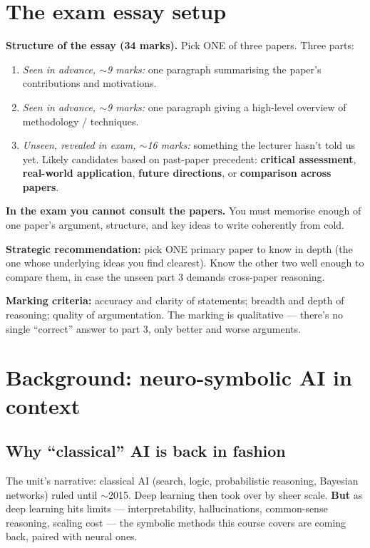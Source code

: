 \documentclass[11pt, a4paper]{article}
\begin{document}
\section{The exam essay setup}

\textbf{Structure of the essay (34 marks).} Pick ONE of three papers. Three parts:

\begin{enumerate}
  \item \emph{Seen in advance, $\sim$9 marks:} one paragraph summarising the paper's contributions and motivations.
  \item \emph{Seen in advance, $\sim$9 marks:} one paragraph giving a high-level overview of methodology / techniques.
  \item \emph{Unseen, revealed in exam, $\sim$16 marks:} something the lecturer hasn't told us yet. Likely candidates based on past-paper precedent: \textbf{critical assessment}, \textbf{real-world application}, \textbf{future directions}, or \textbf{comparison across papers}.
\end{enumerate}

\textbf{In the exam you cannot consult the papers.} You must memorise enough of one paper's argument, structure, and key ideas to write coherently from cold.

\textbf{Strategic recommendation:} pick ONE primary paper to know in depth (the one whose underlying ideas you find clearest). Know the other two well enough to compare them, in case the unseen part 3 demands cross-paper reasoning.

\textbf{Marking criteria:} accuracy and clarity of statements; breadth and depth of reasoning; quality of argumentation. The marking is qualitative — there's no single ``correct'' answer to part 3, only better and worse arguments.

\section{Background: neuro-symbolic AI in context}

\subsection{Why ``classical'' AI is back in fashion}

The unit's narrative: classical AI (search, logic, probabilistic reasoning, Bayesian networks) ruled until $\sim$2015. Deep learning then took over by sheer scale. \textbf{But} as deep learning hits limits — interpretability, hallucinations, common-sense reasoning, scaling cost — the symbolic methods this course covers are coming back, paired with neural ones.
\end{document}
